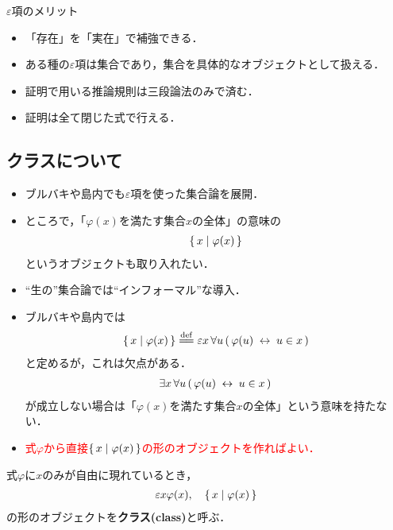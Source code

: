 	\begin{itembox}[l]{$\varepsilon$項のメリット}
		\begin{itemize}
			\item 「存在」を「実在」で補強できる．
			\item ある種の$\varepsilon$項は集合であり，集合を具体的なオブジェクトとして扱える．
			\item 証明で用いる推論規則は三段論法のみで済む．
			\item 証明は全て閉じた式で行える．
		\end{itemize}
	\end{itembox}
	
\newpage
\subsection{クラスについて}
	\begin{itemize}
	\setlength{\itemsep}{10pt}
		\item ブルバキ\cite{}や島内\cite{}でも$\varepsilon$項を使った集合論を展開．
		
		\item ところで，「$\varphi(x)$を満たす集合$x$の全体」の意味の
			\begin{align}
				\left\{\, x \mid \varphi(x)\, \right\}
			\end{align}
			というオブジェクトも取り入れたい．
		
		\item ``生の''集合論では``インフォーマル''な導入．
		
		\item ブルバキ\cite{}や島内\cite{}では
			\begin{align}
				\Set{x}{\varphi(x)} \defeq \varepsilon x\, \forall u\, 
				(\, \varphi(u) \lrarrow u \in x\, )
			\end{align}
			と定めるが，これは欠点がある．
			\begin{align}
				\exists x\, \forall u\, (\, \varphi(u) \hspace{0.25em}\leftrightarrow\hspace{0.25em} u \in x\, )
			\end{align}
			が成立しない場合は「$\varphi(x)$を満たす集合$x$の全体」という意味を持たない．
			
		\item \textcolor{red}{式$\varphi$から直接$\left\{\, x \mid \varphi(x)\, \right\}$の形のオブジェクトを作ればよい．}
	\end{itemize}
	
\newpage
	\begin{screen}
		\begin{dfn}[クラス]
			式$\varphi$に$x$のみが自由に現れているとき，
			\begin{align}
				\varepsilon x \varphi(x), \quad \left\{\, x \mid \varphi(x)\, \right\}
			\end{align}
			の形のオブジェクトを{\bf クラス(class)}と呼ぶ．
		\end{dfn}
	\end{screen}
	
